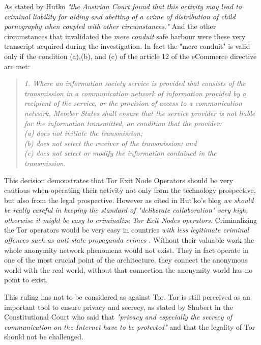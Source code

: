 \documentclass[runningheads,a4paper]{llncs}
\begin{document}
As stated by Huťko \cite{HUSOVEC}\textit{ "the Austrian Court found that this activity may lead to criminal liability for aiding and abetting of a crime of distribution of child pornography when coupled with other circumstances."}
And the other circumstances that invalidated the \textit{mere conduit} safe harbour were these very transcript acquired during the investigation. In fact the "mere conduit" is valid only if the condition (a),(b), and (c) of the article 12 of the eCommerce directive are met: 
\begin{quote}
    \textit{1. Where an information society service is provided that consists of the transmission in a communication network of information provided by a recipient of the service, or the provision of access to a communication network, Member States shall ensure that the service provider is not liable for the information transmitted, on condition that the provider:\\
(a) does not initiate the transmission;\\
(b) does not select the receiver of the transmission; and\\
(c) does not select or modify the information contained in the transmission.}
\end{quote}


This decision demonstrates that Tor Exit Node Operators should be very cautious when operating their activity not only from the technology prospective, but also from the legal prospective. However as cited in Hut'ko's blog \cite{HUSOVEC} \textit{we should be really careful in keeping the standard of "deliberate collaboration" very high, otherwise it might be easy to criminalize Tor Exit Nodes operators}. Criminalizing the Tor operators would be very easy in countries \textit{with less legitimate criminal offences such as anti-state propaganda crimes} \cite{HUSOVEC}. Without their valuable work the whole anonymity network phenomena would not exist. They in fact operate in one of the most crucial point of the architecture, they connect the anonymous world with the real world, without that connection the anonymity world has no point to exist.

This ruling has not to be considered as against Tor. Tor is still perceived as an important tool to ensure privacy and secrecy, as stated by  Shubert in the Constitutional Court who said that \textit{"privacy and especially the secrecy of communication on the Internet have to be protected"} and that the legality of Tor should not be challenged. \cite{PCW}
\end{document}
